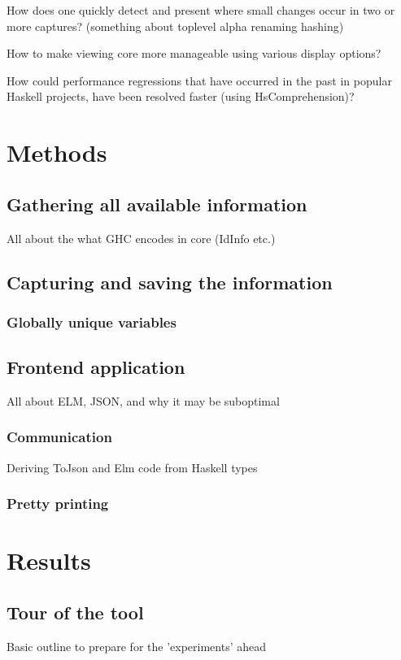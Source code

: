 \documentclass{report}
\begin{document}
How does one quickly detect and present where small changes occur in two or more captures?
  (something about toplevel alpha renaming hashing)

How to make viewing core more manageable using various display options?

How could performance regressions that have occurred in the past in popular Haskell projects,
have been resolved faster (using HsComprehension)?

\chapter{Methods}

\section{Gathering all available information}
All about the what GHC encodes in core (IdInfo etc.)

\section{Capturing and saving the information}
\subsection{Globally unique variables}

\section{Frontend application}
All about ELM, JSON, and why it may be suboptimal

\subsection{Communication}
Deriving ToJson and Elm code from Haskell types
\subsection{Pretty printing}

\chapter{Results}
\section{Tour of the tool}
Basic outline to prepare for the 'experiments' ahead
\end{document}
